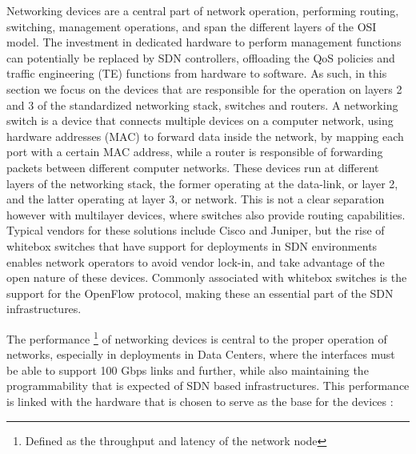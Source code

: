 \begin {enumerate}
Networking devices are a central part of network operation, performing routing, switching, management operations, and span the different layers of the OSI model. 
The investment in dedicated hardware to perform management functions can potentially be replaced by SDN controllers, offloading the QoS policies and traffic
engineering (TE) functions from hardware to software. As such, in this section we focus on the devices that are responsible for the operation on layers 2 and 3 of
the standardized networking stack, switches and routers. A networking switch is a device that connects multiple devices on a computer network, using hardware
addresses (MAC) to forward data inside the network, by mapping each port with a certain MAC address, while a router is responsible of forwarding packets between
different computer networks. These devices run at different layers of the networking stack, the former operating at the data-link, or layer 2, and the latter
operating at layer 3, or network. This is not a clear separation however with multilayer devices, where switches also provide routing capabilities. Typical vendors
for these solutions include Cisco and Juniper, but the rise of whitebox switches that have support for deployments in SDN environments enables network operators to
avoid vendor lock-in, and take advantage of the open nature of these devices. Commonly associated with whitebox switches is the support for the OpenFlow protocol,
making these an essential part of the SDN infrastructures.

\par The performance \footnote {Defined as the throughput and latency of the network node} of networking devices is central to the proper operation of networks,
especially in deployments in Data Centers, where the interfaces must be able to support 100 Gbps links and further, while also maintaining the programmability that
is expected of SDN based infrastructures. This performance is linked with the hardware that is chosen to serve as the base for the devices \cite{sezer_are_2013}:


\end{enumerate}

